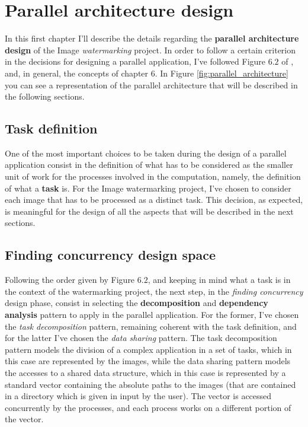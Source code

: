 \chapter{Parallel architecture design} %
\label{cha:parallel_architecture_design}
    In this first chapter I'll describe the details regarding the \textbf{parallel architecture design} of
    the Image \textit{watermarking} project. In order to follow a certain criterion in the decisions
    for designing a parallel application, I've followed Figure $6.2$ of \cite{DSPM}, and, in general, the
    concepts of chapter $6$. In Figure \ref{fig:parallel_architecture} you can see a representation of the
    parallel architecture that will be described in the following sections.

    \section{Task definition} %
    \label{sec:task_definition}
        One of the most important choices to be taken during the design of a parallel application consist in the
        definition of what has to be considered as the smaller unit of work for the processes involved in the
        computation, namely, the definition of what a \textbf{task} is. For the Image watermarking project, I've
        chosen to consider each image that has to be processed as a distinct task. This decision, as expected, is
        meaningful for the design of all the aspects that will be described in the next sections.

    \section{Finding concurrency design space} %
    \label{sec:finding_concurrency_design_space}
        Following the order given by Figure $6.2$, and keeping in mind what a task is in the context of the
        watermarking project, the next step, in the \textit{finding concurrency} design phase, consist in
        selecting the \textbf{decomposition} and \textbf{dependency analysis} pattern to apply in the parallel
        application. For the former, I've chosen the \textit{task decomposition} pattern, remaining coherent with
        the task definition, and for the latter I've chosen the \textit{data sharing} pattern. The task
        decomposition pattern models the division of a complex application in a set of tasks, which in this case
        are represented by the images, while the data sharing pattern models the accesses to a shared data
        structure, which in this case is represented by a standard vector containing the absolute paths to the
        images (that are contained in a directory which is given in input by the user). The vector is accessed
        concurrently by the processes, and each process works on a different portion of the vector.

